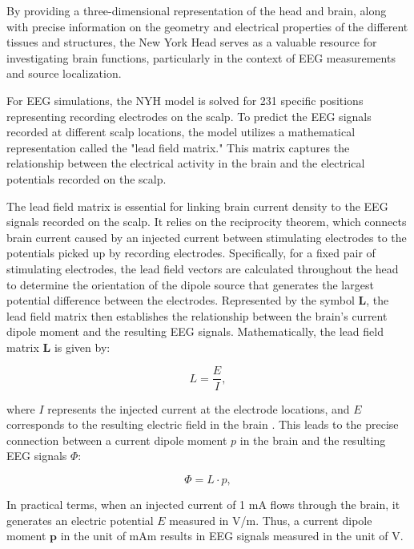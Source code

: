 \documentclass[a4paper, UKenglish, 11pt]{uiomaster}
\begin{document}
By providing a three-dimensional representation of the head and brain, along with precise information on the geometry and electrical properties of the different tissues and structures, the New York Head serves as a valuable resource for investigating brain functions, particularly in the context of EEG measurements and source localization.

For EEG simulations, the NYH model is solved for 231 specific positions representing recording electrodes on the scalp. To predict the EEG signals recorded at different scalp locations, the model utilizes a mathematical representation called the "lead field matrix." This matrix captures the relationship between the electrical activity in the brain and the electrical potentials recorded on the scalp.

The lead field matrix is essential for linking brain current density to the EEG signals recorded on the scalp. It relies on the reciprocity theorem, which connects brain current caused by an injected current between stimulating electrodes to the potentials picked up by recording electrodes. Specifically, for a fixed pair of stimulating electrodes, the lead field vectors are calculated throughout the head to determine the orientation of the dipole source that generates the largest potential difference between the electrodes. Represented by the symbol $\boldsymbol{L}$, the lead field matrix then establishes the relationship between the brain's current dipole moment and the resulting EEG signals. Mathematically, the lead field matrix $\boldsymbol{L}$ is given by:

\begin{equation}
L = \frac{E}{I},
\label{eq:R2}
\end{equation}

where $I$ represents the injected current at the electrode locations, and $E$ corresponds to the resulting electric field in the brain \cite{naess2021biophysically}. This leads to the precise connection between a current dipole moment $p$ in the brain and the resulting EEG signals $\Phi$:

\begin{equation}
\Phi = L \cdot p,
\label{eq:EEG_signal}
\end{equation}

In practical terms, when an injected current of 1 mA flows through the brain, it generates an electric potential $E$ measured in V/m. Thus, a current dipole moment $\textbf{p}$ in the unit of mAm results in EEG signals measured in the unit of V.
\end{document}
